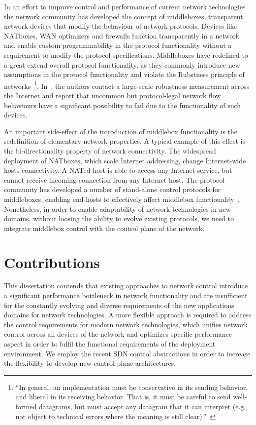 In an effort to improve control and performance of current network technologies
the network community has developed the concept of middleboxes, transparent
network devices that modify the behaviour of network protocols. Devices like
NATboxes, WAN optimizers and firewalls function transparently in a network and
enable custom programmability in the protocol functionality without a
requirement to modify the protocol specifications.  Middleboxes have redefined
to a great extend overall protocol functionality, as they commonly introduce new
assumptions in the protocol functionality and violate the Rubstness principle of
networks~\footnote{``In general, an implementation must be conservative in its
  sending behavior, and liberal in its receiving behavior.  That is, it must be
  careful to send well-formed datagrams, but must accept any datagram that it
  can interpret (e.g., not object to technical errors where the meaning is still
  clear).''~\cite{RFC0791}}. In~\cite{Honda:2011ci}, the authors contact a
large-scale robustness measurement across the Internet and report that uncommon
but protocol-legal network flow behaviours have a significant possibility to
fail due to the functionality of such devices. 

An important side-effect of the introduction of middlebox functionality is the
redefinition of elementary network properties.  A typical example of this effect
is the bi-directionality property of network connectivity. The widespread
deployment of NATboxes, which scale Internet addressing, change Internet-wide
hosts connectivity.  A NATed host is able to access any Internet service, but
cannot receive incoming connection from any Internet host. The protocol
community has developed a number of stand-alone control protocols for
middleboxes, enabling end-hosts to effectively affect middlebox
functionality~\cite{eggert08}. Nonetheless, in order to enable adaptability of
network technologies in new domains, without loosing the ability to evolve
existing protocols, we need to integrate middlebox control with the control
plane of the network. 

\section{Contributions} \label{sec:intro:contributions}

This dissertation contends that existing approaches to network control introduce
a significant performance bottleneck in network functionality and are
insufficient for the constantly evolving and diverse requirements of the new
applications domains for network technologies. A more flexible approach is
required to address the control requirements for modern network technologies,
which unifies network control across all devices of the network and optimizes
specific performance aspect in order to fulfil the functional requirements of
the deployment environment. We employ the recent SDN control abstractions in
order to increase the flexibility to develop new control plane architectures. 

